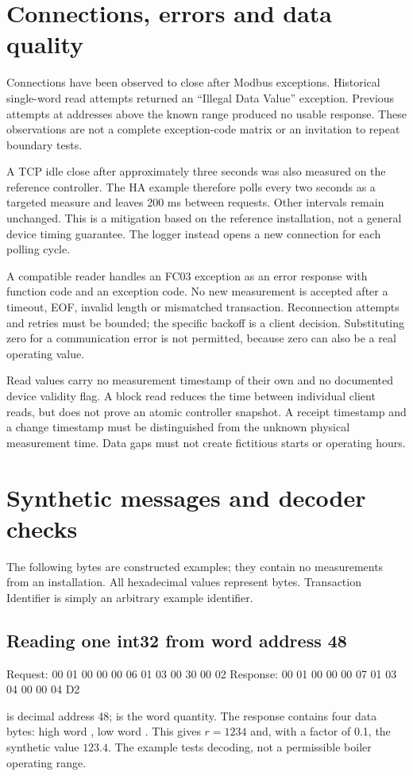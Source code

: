 \documentclass[10pt,a4paper]{article}
\begin{document}
\section{Connections, errors and data quality}
Connections have been observed to close after Modbus exceptions. Historical single-word read attempts returned an ``Illegal Data Value'' exception. Previous attempts at addresses above the known range produced no usable response. These observations are not a complete exception-code matrix or an invitation to repeat boundary tests.

A TCP idle close after approximately three seconds was also measured on the reference controller. The HA example therefore polls  every two seconds as a targeted measure and leaves 200 ms between requests. Other intervals remain unchanged. This is a mitigation based on the reference installation, not a general device timing guarantee. The logger instead opens a new connection for each polling cycle.

A compatible reader handles an FC03 exception as an error response with function code  and an exception code. No new measurement is accepted after a timeout, EOF, invalid length or mismatched transaction. Reconnection attempts and retries must be bounded; the specific backoff is a client decision. Substituting zero for a communication error is not permitted, because zero can also be a real operating value.

Read values carry no measurement timestamp of their own and no documented device validity flag. A block read reduces the time between individual client reads, but does not prove an atomic controller snapshot. A receipt timestamp and a change timestamp must be distinguished from the unknown physical measurement time. Data gaps must not create fictitious starts or operating hours.

\section{Synthetic messages and decoder checks}
\label{sec:vectors}
The following bytes are constructed examples; they contain no measurements from an installation. All hexadecimal values represent bytes. Transaction Identifier  is simply an arbitrary example identifier.

\subsection{Reading one int32 from word address 48}
\begin{CodeBlock}
Request:  00 01 00 00 00 06 01 03 00 30 00 02
Response: 00 01 00 00 00 07 01 03 04 00 00 04 D2
\end{CodeBlock}
 is decimal address 48;  is the word quantity. The response contains four data bytes: high word , low word . This gives $r=1234$ and, with a factor of 0.1, the synthetic value $123.4$. The example tests decoding, not a permissible boiler operating range.
\end{document}

